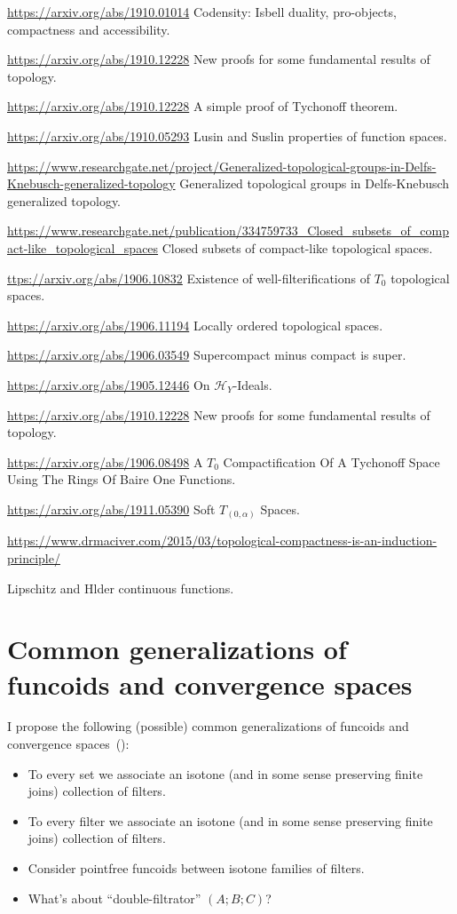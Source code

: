 \documentclass{amsart}
\begin{document}
\url{https://arxiv.org/abs/1910.01014} Codensity: Isbell duality, pro-objects, compactness and accessibility.

\url{https://arxiv.org/abs/1910.12228} New proofs for some fundamental results of topology.

\url{https://arxiv.org/abs/1910.12228} A simple proof of Tychonoff theorem.

\url{https://arxiv.org/abs/1910.05293} Lusin and Suslin properties of function spaces.

\url{https://www.researchgate.net/project/Generalized-topological-groups-in-Delfs-Knebusch-generalized-topology}
Generalized topological groups in Delfs-Knebusch generalized topology.

\url{https://www.researchgate.net/publication/334759733_Closed_subsets_of_compact-like_topological_spaces}
Closed subsets of compact-like topological spaces.

\url{ttps://arxiv.org/abs/1906.10832} Existence of well-filterifications of $T_0$ topological spaces.

\url{https://arxiv.org/abs/1906.11194} Locally ordered topological spaces.

\url{https://arxiv.org/abs/1906.03549} Supercompact minus compact is super.

\url{https://arxiv.org/abs/1905.12446} On $\mathcal{H}_Y$-Ideals.

\url{https://arxiv.org/abs/1910.12228} New proofs for some fundamental results of topology.

\url{https://arxiv.org/abs/1906.08498} A $T_0$ Compactification Of A Tychonoff Space Using The Rings Of Baire One
  Functions.

\url{https://arxiv.org/abs/1911.05390} Soft $T_{(0,\alpha)}$ Spaces.

\url{https://www.drmaciver.com/2015/03/topological-compactness-is-an-induction-principle/}

Lipschitz and Hlder continuous functions.

\section{Common generalizations of funcoids and convergence spaces}

I propose the following (possible) common generalizations of funcoids and convergence spaces~(\cite{converg}):

\begin{itemize}
\item To every set we associate an isotone (and in some sense preserving finite joins) collection of filters.
\item To every filter we associate an isotone (and in some sense preserving finite joins) collection of filters.
\item Consider pointfree funcoids between isotone families of filters.
\item What's about ``double-filtrator'' $(A;B;C)$?
\end{itemize}
\end{document}
